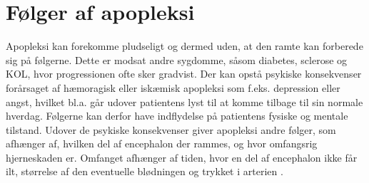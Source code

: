 \section{Følger af apopleksi }
Apopleksi kan forekomme pludseligt og dermed uden, at den ramte kan forberede sig på følgerne. Dette er modsat andre sygdomme, såsom diabetes, sclerose og KOL, hvor progressionen ofte sker gradvist. Der kan opstå psykiske konsekvenser forårsaget af hæmoragisk eller iskæmisk apopleksi som f.eks. depression eller angst, hvilket bl.a. går udover patientens lyst til at komme tilbage til sin normale hverdag. Følgerne kan derfor have indflydelse på patientens fysiske og mentale tilstand. \cite{Muus2008} Udover de psykiske konsekvenser giver apopleksi andre følger, som afhænger af, hvilken del af encephalon der rammes, og hvor omfangsrig hjerneskaden er. Omfanget afhænger af tiden, hvor en del af encephalon ikke får ilt, størrelse af den eventuelle blødningen og trykket i arterien \cite{Michael-Titus2010}. 

